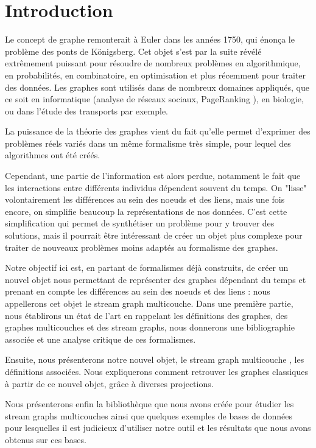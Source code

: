 \documentclass[11pt,a4paper]{article}
\theoremstyle{definition}
\theoremstyle{remark}
\theoremstyle{remark}
\def \stgm {stream graph multicouche}
\def \stgs {stream graphs}
\def \stgms {stream graphs multicouches}
\begin{document}
\newpage

\section*{Introduction}
	Le concept de graphe remonterait à Euler \cite{wikigraphes,divin} dans les années 1750, qui énonça le problème des ponts de Königsberg. Cet objet s'est par la suite révélé extrêmement puissant pour résoudre de nombreux problèmes en algorithmique, en probabilités, en combinatoire, en optimisation et plus récemment pour traiter des données. Les graphes sont utilisés dans de nombreux domaines appliqués, que ce soit en informatique (analyse de réseaux sociaux, PageRanking \cite{pr}), en biologie, ou dans l'étude des transports par exemple.
	
	La puissance de la théorie des graphes vient du fait qu'elle permet d'exprimer des problèmes réels variés dans un même formalisme très simple, pour lequel des algorithmes ont été créés.
	
	Cependant, une partie de l'information est alors perdue, notamment le fait que les interactions entre différents individus dépendent souvent du temps. On "lisse" volontairement les différences au sein des noeuds et des liens, mais une fois encore, on simplifie beaucoup la représentations de nos données. C'est cette \og simplification \fg{}  qui permet de synthétiser un problème pour y trouver des solutions, mais il pourrait être intéressant de créer un objet plus complexe pour traiter de nouveaux problèmes moins adaptés au formalisme des graphes.
	
	Notre objectif ici est, en partant de formalismes déjà construits, de créer un nouvel objet nous permettant de représenter des graphes dépendant du temps et prenant en compte les différences au sein des noeuds et des liens : nous appellerons cet objet le \stgm. Dans une première partie, nous établirons un état de l'art en rappelant les définitions des graphes, des graphes multicouches et des \stgs{}, nous donnerons une bibliographie associée et une analyse critique de ces formalismes. 
	
	Ensuite, nous présenterons notre nouvel objet, le \og \stgm{} \fg{} , les définitions associées. Nous expliquerons comment retrouver les graphes \og classiques\fg{} à partir de ce nouvel objet, grâce à diverses projections.
	
	Nous présenterons enfin la bibliothèque que nous avons créée pour étudier les \stgms{} ainsi que quelques exemples de bases de données pour lesquelles il est judicieux d'utiliser notre outil et les résultats que nous avons obtenus sur ces bases. 
	
\end{document}
